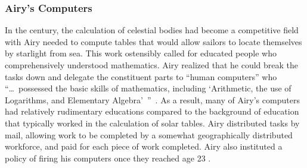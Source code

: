 \documentclass[trackingWork]{subfiles}
\begin{document}
\subsubsection{Airy's Computers}
In the  century, the calculation of celestial bodies had become
a competitive field with 
Airy needed to compute tables that would
allow sailors to locate themselves by starlight from sea.
This work ostensibly called for educated people who comprehensively understood mathematics.
Airy realized that he could break the tasks down and delegate the constituent parts
to ``human computers'' who
``\dots~possessed the basic skills of mathematics,
including `Arithmetic, the use of Logarithms, and Elementary Algebra'~''~\cite{grier2013computers}.
As a result, many of Airy's computers had relatively rudimentary educations
compared to the background of education that typically worked in the calculation of solar tables.
Airy distributed tasks by mail,
allowing work to be completed by a somewhat geographically distributed workforce,
and paid for each piece of work completed.
Airy also instituted a policy of firing his computers once they reached age 23
%
.









\onlyinsubfile{
  \printbibliography
  }
\end{document}
